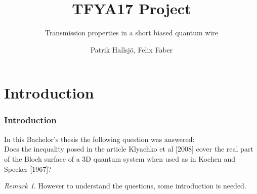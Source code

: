 \documentclass[•]{beamer}
\subtitle{Transmission properties in a short biased quantum wire}
\title{TFYA17 Project}
\author{Patrik Hallsj\"{o}, Felix Faber}
\date{}
\theoremstyle{remark}
\newtheorem{remark}[theorem]{Remark}
\begin{document}
\begin{frame}
\titlepage
\end{frame}
\begin{frame}
\tableofcontents
\end{frame}
\section{Introduction}
\begin{frame}[shrink=10]\frametitle{Introduction}
\begin{block}

In this Bachelor's thesis the following question was answered:\\
Does the inequality posed in the article Klyachko et al [2008] cover the real
part of the Bloch surface of a 3D quantum system when used as in Kochen
and Specker [1967]?
\end{block}
\pause
\begin{remark}
However to understand the questions, some introduction is needed.
\end{remark}
\end{frame}
\end{document}
